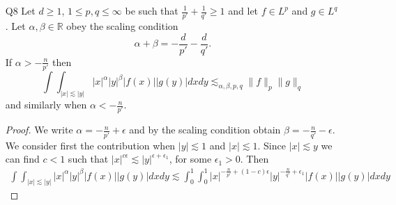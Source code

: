 \documentclass[11pt]{article}
\theoremstyle{remark}
\newcommand{\1}{\textbf{1}}
\newcommand{\lle}{\lesssim}
\def\norm#1{\| #1  \|}
\newcommand{\bbR}{\mathbb{R}}
\begin{document}
\begin{enumerate}
\[
\norm{ \frac{1}{x} \int_0^x f(t) \,dt }_{L^p_x(\bbR^+)} \lle_p \norm{f}_{L^p}
\]
for all $1 < p \leq \infty$ and $f \in L^p$.
\begin{proof}
For $p= \infty$ the claim is obvious so suppose $1 < p < \infty$. By density, we may assume that $f \in C_c^\infty$ and by the triangle inequality, we may assume $f$ is non-negative. Define
\[
F(x) := \frac{1}{x} \int_0^x f(t) dt. 
\]
Then $(x F(x))' = f(x)$ and hence
\[
\int_0^\alpha F(t)^p dt = p \int_0^\alpha t F(t)^{p-1} F'(t) dt = p \int_0^\alpha F(t)^{p-1} ( F(t) - f(t)).
\]
By H\"older's inequality we have
\[
(1 - p) \int_0^\alpha F(t)^p  \leq p \left(\int_0^\alpha F(t)^{p} \right)^{1-1/p} \left(\int_0^\alpha f(t)^p\right)^{1/p},
\]
and taking $\alpha \to \infty$, using that $f \in L^p$, yields the result.
\end{proof}
Alternate approach:
\begin{proof}
Define
\[
Tf (x) = \frac{1}{x} \int_0^x f(t) dt.
\]
Since $T$ is obviously bounded on $L^\infty$ it suffices by Marcinkiewicz and triangle inequality to prove the weak-type $(1,1)$ inequality for a non-negative function with compact support. By homogeneity we may assume $|f| \leq 1$. Let $E(\lambda) = \{x \in \bbR^+ : Tf(x) > \lambda\}$, then by construction
\[
\mu(E(\lambda)) \leq \frac{1}{\lambda} \int_{E(\lambda)} f(x) \;dx 
\]
hence
\[
\sup_{\lambda > 0} \lambda \mu(E(\lambda)) \leq \int_{E(\lambda)} f(x) \leq \norm{f}_{L^1},
\]
which concludes the proof.
\end{proof}
\item[Q8] Let $d \geq 1$, $1 \leq p,q \leq \infty$ be such that $\frac{1}{p'} + \frac{1}{q'} \geq 1$ and let $f \in L^p$ and $g \in L^q$. Let $\alpha, \beta \in \bbR$ obey the scaling condition
\[
\alpha + \beta = -\frac{d}{p'} - \frac{d}{q'}.
\]
If $\alpha > - \frac{n}{p'}$ then
\[
\int \int_{|x| \lle |y|} |x|^\alpha |y|^\beta |f(x)| |g(y)| dx dy \lle_{\alpha,\beta,p,q} \norm{f}_p \norm{g}_q
\]
and similarly when $\alpha < - \frac{n}{p'}$.
\begin{proof}
We write $\alpha =  - \frac{n}{p'} + \epsilon$ and by the scaling condition obtain $\beta =  - \frac{n}{q'} - \epsilon$. We consider first the contribution when $|y| \lle 1$ and $|x| \lle 1$. Since $|x| \lle y$ we can find $c < 1$ such that $|x|^{c\epsilon} \lle |y|^{\epsilon + \epsilon_1}$, for some $\epsilon_1 > 0$. Then
\begin{align*}
\int \int_{|x| \lle |y|} |x|^\alpha |y|^\beta |f(x)| |g(y)| dx dy \lle \int_0^1 \int_0^1 |x|^{- \frac{n}{p'} + (1-c)\epsilon} |y|^{- \frac{n}{q'} + \epsilon_1} |f(x)| |g(y)| dx dy

\end{align*}
\end{proof}
\end{enumerate}
\end{document}
